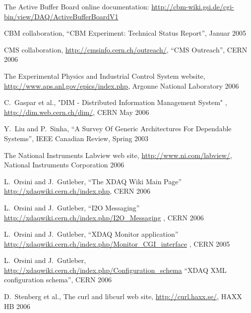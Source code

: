 
The Active Buffer Board online documentation:
\hyperref{http://cbm-wiki.gsi.de/cgi-bin/view/DAQ/ActiveBufferBoardV1}{}{}{http://cbm-wiki.gsi.de/cgi-bin/view/DAQ/ActiveBufferBoardV1}

CBM collaboration, ``CBM Experiment: Technical Status Report'', Januar 2005

CMS collaboration, \hyperref{http://cmsinfo.cern.ch/outreach/}{}{}{http://cmsinfo.cern.ch/outreach/}, ``CMS Outreach'', CERN 2006

The Experimental Physics and  Industrial Control System website,
\hyperref{http://www.aps.anl.gov/epics/index.php}{}{}{http://www.aps.anl.gov/epics/index.php},
Argonne National Laboratory 2006

C.~Gaspar et al., "DIM - Distributed Information Management System" ,
\hyperref{http://dim.web.cern.ch/dim/}{}{}{http://dim.web.cern.ch/dim/},
CERN May 2006

Y.~Liu and P.~Sinha,
``A Survey Of Generic Architectures For Dependable Systems'',
IEEE Canadian Review, Spring 2003

The National Instruments Labview web site, 
\hyperref{http://www.ni.com/labview/}{}{}{http://www.ni.com/labview/},
National Instruments Corporation 2006

L.~Orsini and J.~Gutleber, ``The XDAQ Wiki Main Page''
 \hyperref{http://xdaqwiki.cern.ch/index.php}{}{}{http://xdaqwiki.cern.ch/index.php}, 
 CERN 2006

L.~Orsini and J.~Gutleber, ``I2O Messaging'' \hyperref{http://xdaqwiki.cern.ch/index.php/I2O\_Messaging}{}{}{http://xdaqwiki.cern.ch/index.php/I2O\_Messaging}  , CERN 2006

L.~Orsini and J.~Gutleber, ``XDAQ Monitor application'' \hyperref{http://xdaqwiki.cern.ch/index.php/Monitor\_CGI\_interface}{}{}{http://xdaqwiki.cern.ch/index.php/Monitor\_CGI\_interface} , CERN 2005

L.~Orsini and J.~Gutleber, \hyperref{http://xdaqwiki.cern.ch/index.php/Configuration\_schema}{}{}{http://xdaqwiki.cern.ch/index.php/Configuration\_schema} ``XDAQ XML configuration schema'', CERN 2006

 D.~Stenberg et al., The curl and libcurl web site, 
\hyperref{http://curl.haxx.se/}{}{}{http://curl.haxx.se/},
HAXX HB 2006

